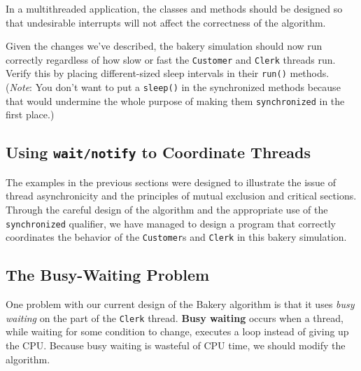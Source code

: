 
\noindent In a multithreaded application, the classes and
methods should be designed so that undesirable interrupts will
not affect the correctness of the algorithm.


\label{self-study-exercise}
\begin{SSTUDY}

\item  Given the changes we've described, the bakery simulation should now
run correctly regardless of how slow or fast the {\tt Customer} and
{\tt Clerk} threads run.  Verify this by placing different-sized sleep
intervals in their {\tt run()} methods.  ({\it Note}: You don't want to
put a {\tt sleep()} in the synchronized methods because that would
undermine the whole purpose of making them {\tt synchronized} in the
first place.)
\end{SSTUDY}


\subsection{Using {\tt wait/notify} to Coordinate Threads}
\noindent The examples in the previous sections were designed to illustrate the
issue of thread asynchronicity and the principles of mutual exclusion
and critical sections.  Through the careful design of the algorithm and
the appropriate use of the {\tt synchronized} qualifier, we have
managed to design a program that correctly coordinates the behavior of
the {\tt Customer}s and {\tt Clerk} in this bakery simulation.

\subsection*{The Busy-Waiting Problem}
\noindent One problem with our current design of the Bakery algorithm is that it
uses {\em busy waiting} 
 on the part of the {\tt Clerk} thread. {\bf
Busy waiting} occurs when a thread, while waiting for some condition
to change, executes a loop instead of giving up the CPU.  Because busy
waiting is wasteful of CPU time, we should modify the algorithm.

